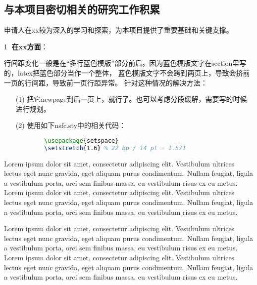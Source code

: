 
\subsection{与本项目密切相关的研究工作积累}
申请人在xx较为深入的学习和探索，为本项目提供了重要基础和关键支撑。

\textcircled{\small 1} {\bfseries 在xx方面}：

行间距变化一般是在“多行蓝色模版”部分前后。因为蓝色模版文字在section里写的，latex把蓝色部分当作一个整体，
蓝色模版文字不会跨到两页上，导致会挤前一页的行间距，导致前一页行距异常。
针对这种情况的解决方法：
\begin{itemize}
	\item[(1)] 把它newpage到后一页上，就行了。也可以考虑分段缓解，需要写的时候进行规划。
	\item[(2)] 使用如下nsfc.sty中的相关代码：
	\begin{lstlisting}[language=tex, basicstyle=\ttfamily\small, keywordstyle=\color{blue}, commentstyle=\color{gray}]
		%自动段落的行间距微调
		\usepackage{setspace}
		\setstretch{1.6} % 22 bp / 14 pt = 1.571
	\end{lstlisting}
\end{itemize}

Lorem ipsum dolor sit amet, consectetur adipiscing elit. Vestibulum ultrices lectus eget nunc gravida, eget aliquam purus condimentum. Nullam feugiat, ligula a vestibulum porta, orci sem finibus massa, eu vestibulum risus ex eu metus. 
Lorem ipsum dolor sit amet, consectetur adipiscing elit. Vestibulum ultrices lectus eget nunc gravida, eget aliquam purus condimentum. Nullam feugiat, ligula a vestibulum porta, orci sem finibus massa, eu vestibulum risus ex eu metus.

Lorem ipsum dolor sit amet, consectetur adipiscing elit. Vestibulum ultrices lectus eget nunc gravida, eget aliquam purus condimentum. Nullam feugiat, ligula a vestibulum porta, orci sem finibus massa, eu vestibulum risus ex eu metus. 
Lorem ipsum dolor sit amet, consectetur adipiscing elit. Vestibulum ultrices lectus eget nunc gravida, eget aliquam purus condimentum. Nullam feugiat, ligula a vestibulum porta, orci sem finibus massa, eu vestibulum risus ex eu metus.
